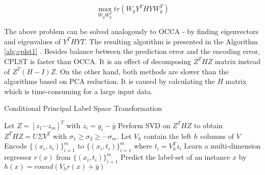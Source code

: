 \begin{equation}\label{eq:cplst6}
    \max_{W_yW_y^T} tr(W_yY^THYW_y^T)  
\end{equation}

The above problem can be solved analogously to OCCA - by finding eigenvectors and eigenvalues of $Y^THYT$. The resulting algorithm is presented in the Algorithm \ref{alg:cplst1} \cite{ChenLin}. Besides balance between the prediction error and the encoding error, CPLST is faster than OCCA. It is an effect of decomposing $Z^THZ$ matrix instead of $Z^T(H-I)Z$. On the other hand, both methods are slower than the algorithms based on PCA reduction. It is caused by calculating the $H$ matrix which is time-consuming for a large input data.

\begin{algorithm}
    \caption{Conditional Principal Label Space Transformation}\label{alg:cplst1}
    \begin{algorithmic}[1]
        \State Let $Z=[z_1 \cdots z_m]^T$ with $z_i=y_i-\bar{y}$
        \State Perform SVD on $Z^THZ$ to obtain $Z^THZ=U\Sigma V^T$ with $\sigma_{1} \geq \sigma_{2} \geq \cdots \sigma_{m}$. Let $V_h$ contain the left $h$ columns of $V$
        \State Encode $\{(x_i,z_i)\}^{m}_{i=1}$ to $\{(x_i,t_i)\}^{m}_{i=1}$ where $t_i=V^T_hz_i$
        \State Learn a multi-dimension regressor $r(x)$ from $\{(x_i,t_i)\}^{m}_{i=1}$ 
        \State Predict the label-set of an instance $x$ by $h(x)=round(V_hr(x)+\bar{y})$  
    \end{algorithmic}
\end{algorithm}


